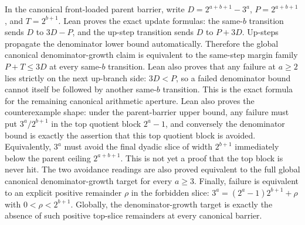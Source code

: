 \begin{theorem}
  \label{thm:collatz-canonical-denominator-same-step-margin}
  \leanok
  In the canonical front-loaded parent barrier, write
  \(D=2^{a+b+1}-3^a\), \(P=2^{a+b+1}\), and \(T=2^{b+1}\). Lean proves the
  exact update formulas: the same-\(b\) transition sends \(D\) to \(3D-P\), and
  the up-step transition sends \(D\) to \(P+3D\). Up-steps propagate the
  denominator lower bound automatically. Therefore the global canonical
  denominator-growth claim is equivalent to the same-step margin family
  \(P+T\le 3D\) at every same-\(b\) transition. Lean also proves that any
  failure at \(a\ge2\) lies strictly on the next up-branch side:
  \(3D<P\), so a failed denominator bound cannot itself be followed by another
  same-\(b\) transition. This is the exact formula for the remaining canonical
  arithmetic aperture. Lean also proves the
  counterexample shape: under the parent-barrier upper bound, any failure must
  put \(3^a/2^{b+1}\) in the top quotient block \(2^a-1\), and conversely the
  denominator bound is exactly the assertion that this top quotient block is
  avoided. Equivalently, \(3^a\) must avoid the final dyadic slice of width
  \(2^{b+1}\) immediately below the parent ceiling \(2^{a+b+1}\). This is not
  yet a proof that the top block is never hit. The two avoidance readings are
  also proved equivalent to the full global canonical denominator-growth target
  for every \(a\ge3\). Finally, failure is equivalent to an explicit positive
  remainder \(\rho\) in the forbidden slice:
  \(3^a=(2^a-1)2^{b+1}+\rho\) with \(0<\rho<2^{b+1}\). Globally, the
  denominator-growth target is exactly the absence of such positive top-slice
  remainders at every canonical barrier.
\end{theorem}

